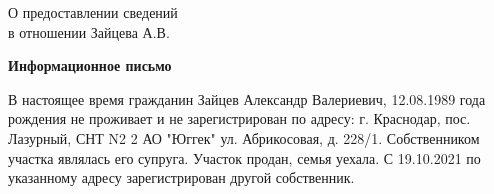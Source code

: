 \begin{flushleft}
	\vspace{10mm}
О предоставлении сведений\\
в отношении Зайцева  А.В.
\end{flushleft}
\vspace{7mm}
\begin{center}
	\Large\textbf{Информационное письмо}
\end{center}
\par

 В настоящее время гражданин Зайцев Александр Валериевич, 12.08.1989 года рождения не проживает и не зарегистрирован по адресу:  г. Краснодар, пос. Лазурный, СНТ N2 2 АО "Юггек" ул. Абрикосовая, д. 228/1.  Собственником участка являлась его супруга. Участок продан, семья уехала. С 19.10.2021   по указанному адресу зарегистрирован другой собственник. 

\vspace{35mm}




